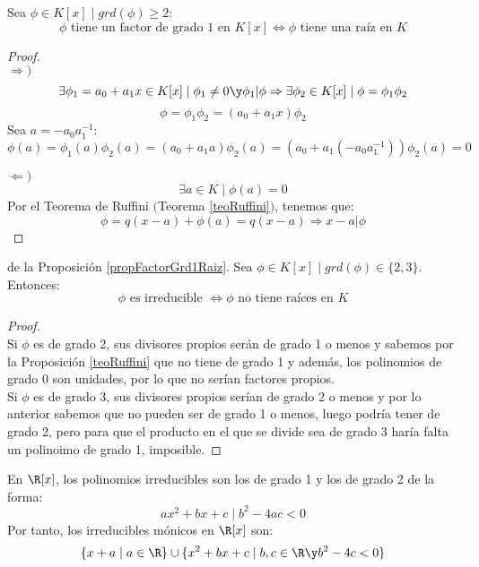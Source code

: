 \begin{prop}
    \label{propFactorGrd1Raiz}
    Sea $\phi \in K[x] \mid grd(\phi) \geq 2$:
    $$\phi \mbox{ tiene un factor de grado } 1 \mbox{ en } K[x] \Leftrightarrow \phi \mbox{ tiene una raíz en } K$$
\begin{proof}
    \ \\
    $\Longrightarrow)$
    $$\exists \phi_1 = a_0+a_1x \in K[x] \mid \phi_1 \neq 0 \y \phi_1|\phi \Rightarrow \exists \phi_2 \in K[x] \mid \phi = \phi_1\phi_2$$
    $$\phi = \phi_1\phi_2 = (a_0+a_1x)\phi_2$$
    Sea $a = -a_0a_1^{-1}$:
    $$\phi(a) = \phi_1(a)\phi_2(a) = (a_0+a_1a)\phi_2(a) = (a_0+a_1(-a_0a_1^{-1}))\phi_2(a) = 0$$

    
    $\Longleftarrow)$ $$\exists a \in K \mid \phi(a) = 0$$
    Por el Teorema de Ruffini $($Teorema \ref{teoRuffini}$)$, tenemos que:
    $$\phi = q(x-a)+\phi(a) = q(x-a) \Rightarrow x-a|\phi$$
\end{proof}
\end{prop}

\begin{coro}
    \label{corCritRaiz}
    de la Proposición \ref{propFactorGrd1Raiz}.\newline
    Sea $\phi \in K[x] \mid grd(\phi) \in \{2,3\}$. Entonces:
    $$\phi \mbox{ es irreducible } \Leftrightarrow \phi \mbox{ no tiene raíces en } K$$
\begin{proof}
    \ \\
    Si $\phi$ es de grado 2, sus divisores propios serán de grado 1 o menos y sabemos por la Proposición \ref{teoRuffini}
    que no tiene de grado 1 y además, los polinomios de grado 0 son unidades, por lo que no serían factores propios.\\

    
    Si $\phi$ es de grado 3, sus divisores propios serían de grado 2 o menos y por lo anterior sabemos que no pueden ser
    de grado 1 o menos, luego podría tener de grado 2, pero para que el producto en el que se divide sea de grado 3 haría
    falta un polinoimo de grado 1, imposible.
\end{proof}
\end{coro}

\begin{teo}
    En $\R[x]$, los polinomios irreducibles son los de grado 1 y los de grado 2 de la forma:
    $$ax^2+bx+c \mid b^2-4ac<0$$
    Por tanto, los irreducibles mónicos en $\R[x]$ son:
    $$\{x+a \mid a \in \R\} \cup \{x^2+bx+c \mid b,c \in \R \y b^2-4c < 0\}$$
\end{teo}

